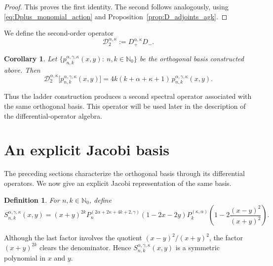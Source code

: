 \documentclass[reqno,10pt]{amsart}
\theoremstyle{plain}
\newtheorem{corollary}[theorem]{Corollary}
\newtheorem{definition}[theorem]{Definition}
\numberwithin{equation}{section}
\numberwithin{figure}{section}
\begin{document}
\begin{proof}
This proves the first identity. The second follows analogously, using
\eqref{eq:Dplus_monomial_action} and Proposition~\ref{prop:D_adjoints_agk}.
\end{proof}

We define the second-order operator
\begin{equation*}%
\mathcal{D}_{2}^{\alpha,\kappa}
:=
D_{+}^{\alpha,\kappa}D_{-}.
\end{equation*}

\begin{corollary}\label{coro:D2_agk}
Let $\{p_{n,k}^{\alpha,\gamma,\kappa}(x,y):\ n,k\in\mathbb{N}_0\}$ be the orthogonal basis constructed above. Then
\[
\mathcal{D}_{2}^{\alpha,\kappa}
\big[p_{n,k}^{\alpha,\gamma,\kappa}(x,y)\big]
=
4k(k+\alpha+\kappa+1)\,
p_{n,k}^{\alpha,\gamma,\kappa}(x,y).
\]
\end{corollary}

Thus the ladder construction produces a second spectral operator associated
with the same orthogonal basis. This operator will be used later in the
description of the differential-operator algebra.

\section{An explicit Jacobi basis}\label{sec:explicit-jacobi}

The preceding sections characterize the orthogonal basis through its
differential operators. We now give an explicit Jacobi representation of the
same basis. 
 

\begin{definition}%
For $n,k\in\mathbb{N}_0$, define
\begin{equation}\label{S_nk_agk}
S_{n,k}^{\alpha,\gamma,\kappa}(x,y)
=
(x+y)^{2k}
P_n^{(2\alpha+2\kappa+4k+2,\gamma)}(1-2x-2y)
P_k^{(\kappa,\alpha)}
\left(1-2\frac{(x-y)^2}{(x+y)^2}\right).
\end{equation}
\end{definition}

Although the last factor involves the quotient $(x-y)^2/(x+y)^2$, the factor $(x+y)^{2k}$ clears the denominator. Hence
$S_{n,k}^{\alpha,\gamma,\kappa}(x,y)$ is a symmetric polynomial in $x$ and
$y$.
\end{document}
